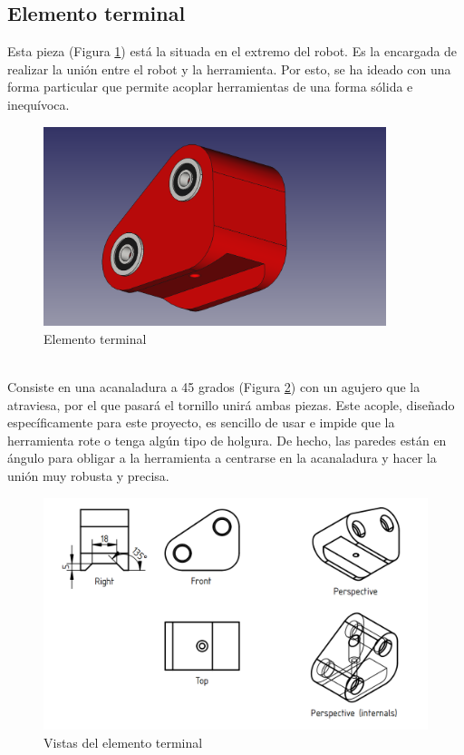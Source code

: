 \subsection{Elemento terminal}
\noindent Esta pieza (Figura \ref{fig:extremo_pieza}) está la situada en el extremo del robot. Es la encargada de realizar la unión entre el robot y la herramienta. Por esto, 
se ha ideado con una forma particular que permite acoplar herramientas de una forma sólida e inequívoca. 
\begin{figure} [ht!]
  \begin{center}
    \includegraphics[width=10cm]{figs/extremo_robot.png}
  \end{center}
  \caption{Elemento terminal}
  \label{fig:extremo_pieza}
\end{figure}\ 
\\
Consiste en una acanaladura a 45 grados (Figura \ref{fig:vistas_extremo}) con un agujero que la atraviesa, por el que pasará el tornillo unirá ambas piezas. 
Este acople, diseñado específicamente para este proyecto, es sencillo de usar e impide que la herramienta rote o 
tenga algún tipo de holgura. De hecho, las paredes están en ángulo para obligar a la herramienta a centrarse en la acanaladura y hacer 
la unión muy robusta y precisa.
\begin{figure} [ht!]
  \begin{center}
    \includegraphics[width=14cm]{figs/vistas_extremo.png}
  \end{center}
  \caption{Vistas del elemento terminal}
  \label{fig:vistas_extremo}
\end{figure}\ 


